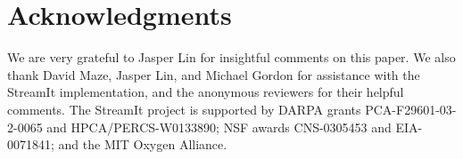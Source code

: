 \section{Acknowledgments}

We are very grateful to Jasper Lin for insightful comments on this
paper.  We also thank David Maze, Jasper Lin, and Michael Gordon for
assistance with the StreamIt implementation, and the anonymous
reviewers for their helpful comments.  The StreamIt project is
supported by DARPA grants PCA-F29601-03-2-0065 and
HPCA/PERCS-W0133890; NSF awards CNS-0305453 and EIA-0071841; and the
MIT Oxygen Alliance.
